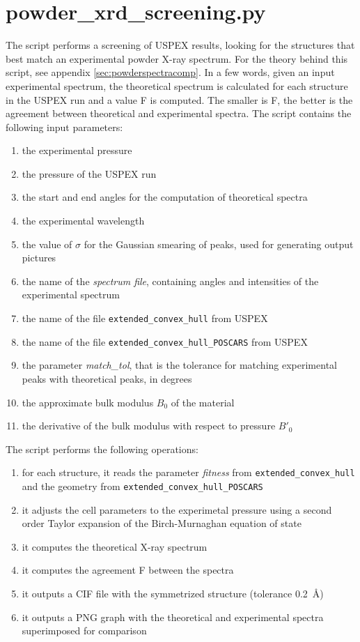 \documentclass{article}
\begin{document}
\section{powder\_xrd\_screening.py}
The script performs a screening of USPEX results, looking for the structures that best match an experimental powder X-ray spectrum. For the theory behind this script, see appendix \ref{sec:powderspectracomp}. In a few words, given an input experimental spectrum, the theoretical spectrum is calculated for each structure in the USPEX run and a value F is computed. The smaller is F, the better is the agreement between theoretical and experimental spectra. The script contains the following input parameters:
\begin{enumerate}
	\item the experimental pressure
	\item the pressure of the USPEX run
	\item the start and end angles for the computation of theoretical spectra
	\item the experimental wavelength
	\item the value of $\sigma$ for the Gaussian smearing of peaks, used for generating output pictures
	\item the name of the \emph{spectrum file}, containing angles and intensities of the experimental spectrum
	\item the name of the file \texttt{extended\_convex\_hull} from USPEX
	\item the name of the file \texttt{extended\_convex\_hull\_POSCARS} from USPEX
	\item the parameter \emph{match\_tol}, that is the tolerance for matching experimental peaks with theoretical peaks, in degrees
	\item the approximate bulk modulus $B_0$ of the material
	\item the derivative of the bulk modulus with respect to pressure $B'_0$
\end{enumerate}
The script performs the following operations:
\begin{enumerate}
	\item for each structure, it reads the parameter \emph{fitness} from \texttt{extended\_convex\_hull} and the geometry from \texttt{extended\_convex\_hull\_POSCARS}
	\item it adjusts the cell parameters to the experimetal pressure using a second order Taylor expansion of the Birch-Murnaghan equation of state
	\item it computes the theoretical X-ray spectrum
	\item it computes the agreement F between the spectra
	\item it outputs a CIF file with the symmetrized structure (tolerance 0.2~\AA)
	\item it outputs a PNG graph with the theoretical and experimental spectra superimposed for comparison
\end{enumerate}
\end{document}
